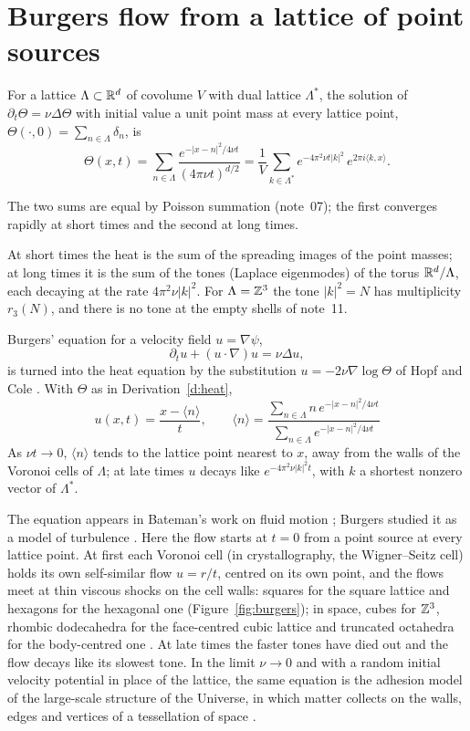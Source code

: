 \documentclass[11pt]{article}
\begin{document}
\section{Burgers flow from a lattice of point sources}

\begin{derivation}\label{d:heat}
For a lattice $\Lambda\subset\mathbb{R}^d$ of covolume $V$ with dual lattice $\Lambda^*$, the solution of $\partial_t\Theta = \nu\Delta\Theta$ with initial value a unit point mass at every lattice point, $\Theta(\cdot,0) = \sum_{n\in\Lambda}\delta_n$, is
\[
  \Theta(x,t) = \sum_{n\in\Lambda}\frac{e^{-|x-n|^2/4\nu t}}{(4\pi\nu t)^{d/2}} = \frac1V\sum_{k\in\Lambda^*}e^{-4\pi^2\nu t|k|^2}\,e^{2\pi i\langle k,x\rangle}.
\]
\end{derivation}

\noindent
The two sums are equal by Poisson summation (note~07); the first converges rapidly at short times and the second at long times.

\physical
At short times the heat is the sum of the spreading images of the point masses; at long times it is the sum of the tones (Laplace eigenmodes) of the torus $\mathbb{R}^d/\Lambda$, each decaying at the rate $4\pi^2\nu|k|^2$.
For $\Lambda = \mathbb{Z}^3$ the tone $|k|^2 = N$ has multiplicity $r_3(N)$, and there is no tone at the empty shells of note~11.

\begin{derivation}\label{d:burgers}
Burgers' equation for a velocity field $u = \nabla\psi$,
\[
  \partial_tu+(u\cdot\nabla)u = \nu\Delta u,
\]
is turned into the heat equation by the substitution $u = -2\nu\nabla\log\Theta$ of Hopf and Cole \cite{Hopf, Cole}.
With $\Theta$ as in Derivation~\ref{d:heat},
\[
  \boxed{\;u(x,t) = \frac{x-\langle n\rangle}{t},\qquad \langle n\rangle = \frac{\sum_{n\in\Lambda}n\,e^{-|x-n|^2/4\nu t}}{\sum_{n\in\Lambda}e^{-|x-n|^2/4\nu t}}\;}
\]
As $\nu t\to0$, $\langle n\rangle$ tends to the lattice point nearest to $x$, away from the walls of the Voronoi cells of $\Lambda$; at late times $u$ decays like $e^{-4\pi^2\nu|k|^2t}$, with $k$ a shortest nonzero vector of $\Lambda^*$.
\end{derivation}

\physical
The equation appears in Bateman's work on fluid motion \cite{Bateman}; Burgers studied it as a model of turbulence \cite{Burgers}.
Here the flow starts at $t = 0$ from a point source at every lattice point.
At first each Voronoi cell (in crystallography, the Wigner--Seitz cell) holds its own self-similar flow $u = r/t$, centred on its own point, and the flows meet at thin viscous shocks on the cell walls: squares for the square lattice and hexagons for the hexagonal one (Figure~\ref{fig:burgers}); in space, cubes for $\mathbb{Z}^3$, rhombic dodecahedra for the face-centred cubic lattice and truncated octahedra for the body-centred one \cite{ConwaySloane}.
At late times the faster tones have died out and the flow decays like its slowest tone.
In the limit $\nu\to0$ and with a random initial velocity potential in place of the lattice, the same equation is the adhesion model of the large-scale structure of the Universe, in which matter collects on the walls, edges and vertices of a tessellation of space \cite{GSS}.
\end{document}
